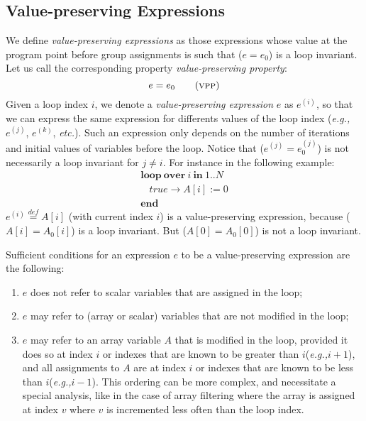 \documentclass[a4paper,10pt]{article}
\newcommand{\eg}{\textit{e.g.,}\xspace}
\newcommand{\etc}{\textit{etc.}\xspace}
\newcommand{\idx}{\ensuremath{i}\xspace}
\newcommand{\KWloop}{\ensuremath{\mathrm{\textbf{loop}}~}}
\newcommand{\KWend}{\ensuremath{\mathrm{\textbf{end}}~}}
\newcommand{\KWover}{\ensuremath{\mathrm{\textbf{over}}~}}
\newcommand{\KWin}{\ensuremath{~\mathrm{\textbf{in}}~}}
\newcommand{\at}[1]{{(#1)}}
\newcommand{\symdef}{\ensuremath{\overset{\mathit{def}}{=}}}
\newcommand{\vpp}{\textsc{vpp}\xspace}
\begin{document}
\subsection{Value-preserving Expressions}

We define \textit{value-preserving expressions} as those expressions whose
value at the program point before group assignments is such that ($e=e_0$) 
is a loop invariant. Let us call the corresponding property
\textit{value-preserving property}:
\begin{equation}
 e=e_0 \tag{\vpp}
\end{equation}
Given a loop index \idx, we denote a \textit{value-preserving expression} $e$
as $e^\at{\idx}$, so that we can express the same expression for differents
values of the loop index (\eg $e^\at{j}$, $e^\at{k}$, \etc). Such an expression
only depends on the number of iterations and initial values of variables
before the loop. Notice that ($e^\at{j} = e_0^\at{j}$) is not necessarily a
loop invariant for $j \neq i$.  For instance in the following example:
$$\begin{array}{l}
  \KWloop \KWover i \KWin 1 .. N \\
  ~~~~ \mathit{true} \rightarrow A[i] := 0\\
  \KWend
\end{array}$$
$e^\at{\idx} \symdef A[\idx]$ (with current index \idx) is a 
value-preserving expression, because ($A[\idx]=A_0[\idx]$) is a loop 
invariant. But ($A[0]=A_0[0]$) is not a loop invariant.

Sufficient conditions for an expression $e$ to be a value-preserving expression
are the following:
\begin{enumerate}
\item $e$ does not refer to scalar variables that are assigned in the loop;
\item $e$ may refer to (array or scalar) variables that are not modified in the loop;
\item $e$ may refer to an array variable $A$ that is modified in the loop,
  provided it does so at index \idx or indexes that are known to be greater
  than \idx (\eg $\idx + 1$), and all assignments to $A$ are at index \idx or
  indexes that are known to be less than \idx (\eg $\idx - 1$). This ordering
  can be more complex, and necessitate a special analysis, like in the case of
  array filtering where the array is assigned at index $v$ where $v$ is
  incremented less often than the loop index.
\end{enumerate}
\end{document}
